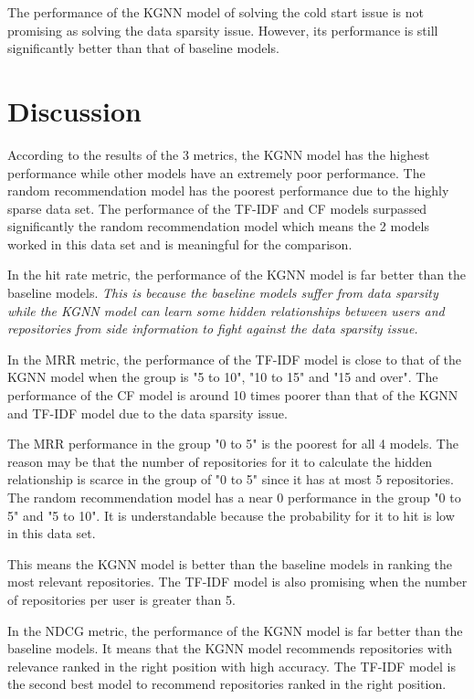 \documentclass[11pt,twoside]{report}
\begin{document}
The performance of the KGNN model of solving the cold start issue is not promising as solving the data sparsity issue. However, its performance is still significantly better than that of baseline models.

\section{Discussion}
According to the results of the 3 metrics, the KGNN model has the highest performance while other models have an extremely poor performance. The random recommendation model has the poorest performance due to the highly sparse data set. The performance of the TF-IDF and CF models surpassed significantly the random recommendation model which means the 2 models worked in this data set and is meaningful for the comparison.

In the hit rate metric, the performance of the KGNN model is far better than the baseline models. \textit{This is because the baseline models suffer from data sparsity while the KGNN model can learn some hidden relationships between users and repositories from side information to fight against the data sparsity issue.}

In the MRR metric, the performance of the TF-IDF model is close to that of the KGNN model when the group is "5 to 10", "10 to 15" and "15 and over". The performance of the CF model is around 10 times poorer than that of the KGNN and TF-IDF model due to the data sparsity issue.

The MRR performance in the group "0 to 5" is the poorest for all 4 models. The reason may be that the number of repositories for it to calculate the hidden relationship is scarce in the group of "0 to 5" since it has at most 5 repositories. The random recommendation model has a near 0 performance in the group "0 to 5" and "5 to 10". It is understandable because the probability for it to hit is low in this data set.

This means the KGNN model is better than the baseline models in ranking the most relevant repositories. The TF-IDF model is also promising when the number of repositories per user is greater than 5.

In the NDCG metric, the performance of the KGNN model is far better than the baseline models. It means that the KGNN model recommends repositories with relevance ranked in the right position with high accuracy. The TF-IDF model is the second best model to recommend repositories ranked in the right position.
\end{document}
